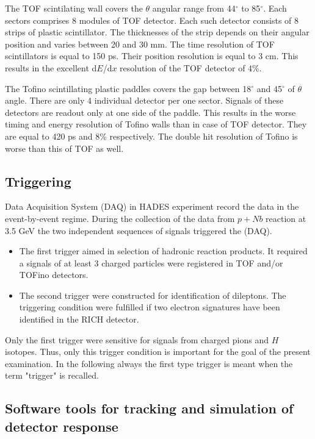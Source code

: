 The TOF scintilating wall covers the $\theta$ angular range from 44$^{\circ}$ to 85$^{\circ}$. 
Each sectors comprises 8 modules of TOF detector. Each such detector consists of 8 strips of plastic scintillator. 
The thicknesses of the strip depends on their angular position and varies between 20 and 30 mm.
The time resolution of TOF scintillators is equal to 150 ps. Their position resolution is equal to 3 cm.
This results in the excellent d$E$/d$x$ resolution of the TOF detector of 4\%.  

The Tofino scintillating plastic paddles covers the gap between 18$^{\circ}$ and 45$^{\circ}$ of $\theta$ angle.
There are only 4 individual detector per one sector. 
Signals of these detectors are readout only at one side of the paddle. This results 
in the worse timing and energy resolution of Tofino walls than in case of TOF detector. 
They are equal to 420 ps and 8\% respectively.
The double hit resolution of Tofino is worse than this of TOF as well.


\subsection{Triggering}

Data Acquisition System (DAQ) in HADES experiment record the data in the event-by-event regime. 
During the collection of the data from $p+Nb$ reaction at 3.5 GeV the two independent sequences of signals triggered the (DAQ).

\begin{itemize}
\item The first trigger aimed in selection of hadronic reaction products. It required a signals of at least 3 charged particles were registered 
in TOF and/or TOFino detectors.  
\item The second trigger were constructed for identification of dileptons. The triggering condition were fulfilled if two electron signatures have been
identified in the RICH detector.
\end{itemize}

Only the first trigger were sensitive for signals from charged pions and $H$ isotopes. 
Thus, only this trigger condition is important for the goal of the present examination. 
In the following always the first type trigger is meant when the term "trigger" is recalled.

\subsection{\label{HGeant_Hydra} Software tools for tracking and simulation of detector response}

